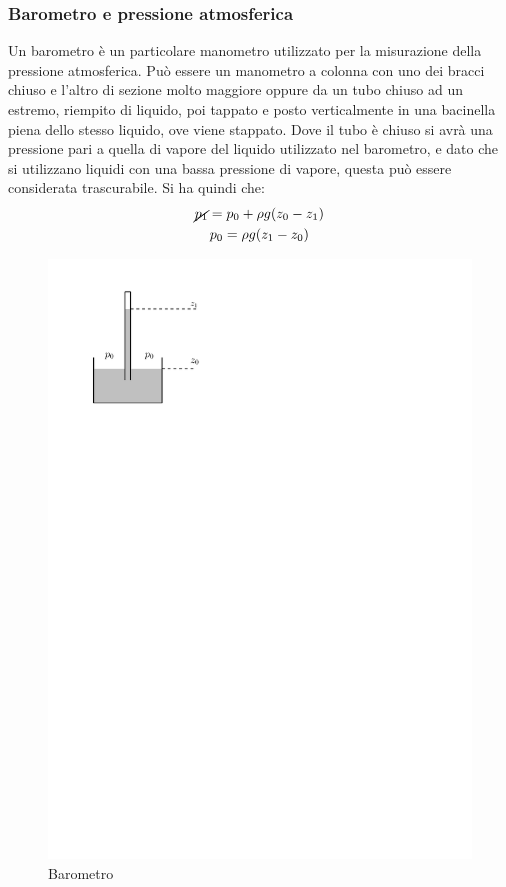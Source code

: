 \subsubsection{Barometro e pressione atmosferica}
Un barometro è un particolare manometro utilizzato per la misurazione della pressione atmosferica.
Può essere un manometro a colonna con uno dei bracci chiuso e l'altro di sezione molto maggiore oppure da un tubo chiuso ad un estremo, riempito di liquido, poi tappato e posto verticalmente in una bacinella piena dello stesso liquido, ove viene stappato.
Dove il tubo è chiuso si avrà una pressione pari a quella di vapore del liquido utilizzato nel barometro, e dato che si utilizzano liquidi con una bassa pressione di vapore, questa può essere considerata trascurabile.
Si ha quindi che:
	\begin{equation*}
		\begin{gathered}
			\cancel{p_1} = p_0 + \rho g (z_0 - z_1) \\
			p_0 = \rho g (z_1 - z_0)
		\end{gathered}
	\end{equation*}
	
	\begin{figure}[ht]
		\includegraphics[scale=0.80]{./2.3 Manometri/2.3-4}
		\centering
		\caption{Barometro}
	\end{figure}
	
